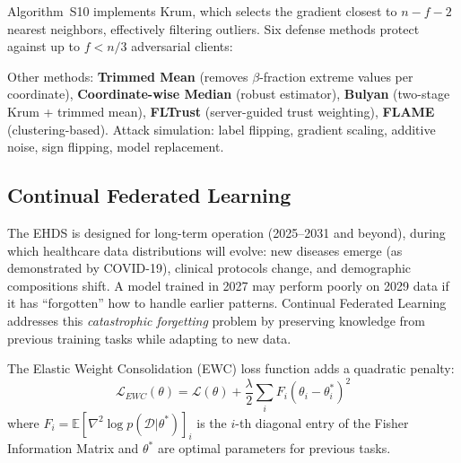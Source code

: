 \documentclass[conference]{IEEEtran}
\begin{document}
Algorithm~S10 implements Krum, which selects the gradient closest to $n{-}f{-}2$ nearest neighbors, effectively filtering outliers. Six defense methods protect against up to $f < n/3$ adversarial clients:

\begin{figure}[htbp]
\centering
{}
\end{figure}

Other methods: \textbf{Trimmed Mean} (removes $\beta$-fraction extreme values per coordinate), \textbf{Coordinate-wise Median} (robust estimator), \textbf{Bulyan} (two-stage Krum + trimmed mean), \textbf{FLTrust} (server-guided trust weighting), \textbf{FLAME} (clustering-based). Attack simulation: label flipping, gradient scaling, additive noise, sign flipping, model replacement.

\subsection{Continual Federated Learning}

The EHDS is designed for long-term operation (2025--2031 and beyond), during which healthcare data distributions will evolve: new diseases emerge (as demonstrated by COVID-19), clinical protocols change, and demographic compositions shift. A model trained in 2027 may perform poorly on 2029 data if it has ``forgotten'' how to handle earlier patterns. Continual Federated Learning addresses this \textit{catastrophic forgetting} problem by preserving knowledge from previous training tasks while adapting to new data.

The Elastic Weight Consolidation (EWC) loss function adds a quadratic penalty:
\[
\mathcal{L}_{EWC}(\theta) = \mathcal{L}(\theta) + \frac{\lambda}{2} \sum_i F_i (\theta_i - \theta_i^*)^2
\]
where $F_i = \mathbb{E}[\nabla^2 \log p(\mathcal{D}|\theta^*)]_i$ is the $i$-th diagonal entry of the Fisher Information Matrix and $\theta^*$ are optimal parameters for previous tasks.
\end{document}
